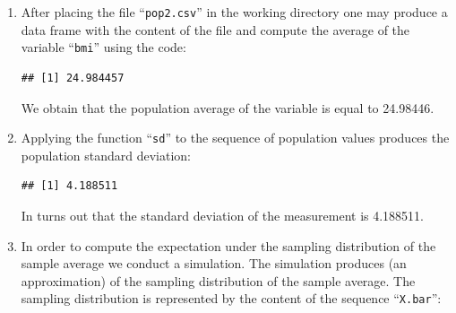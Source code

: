 \documentclass[]{krantz}
\makeatletter
\newenvironment{Shaded}{\begin{snugshade}}{\end{snugshade}}
\newcommand{\ControlFlowTok}[1]{\textcolor[rgb]{0.13,0.29,0.53}{\textbf{#1}}}
\newcommand{\DataTypeTok}[1]{\textcolor[rgb]{0.13,0.29,0.53}{#1}}
\newcommand{\DecValTok}[1]{\textcolor[rgb]{0.00,0.00,0.81}{#1}}
\newcommand{\FloatTok}[1]{\textcolor[rgb]{0.00,0.00,0.81}{#1}}
\newcommand{\KeywordTok}[1]{\textcolor[rgb]{0.13,0.29,0.53}{\textbf{#1}}}
\newcommand{\NormalTok}[1]{#1}
\newcommand{\OperatorTok}[1]{\textcolor[rgb]{0.81,0.36,0.00}{\textbf{#1}}}
\newcommand{\StringTok}[1]{\textcolor[rgb]{0.31,0.60,0.02}{#1}}
\newenvironment{kframe}{%
\medskip{}
\setlength{\fboxsep}{.8em}
 \def\at@end@of@kframe{}%
 \ifinner\ifhmode%
  \def\at@end@of@kframe{\end{minipage}}%
  \begin{minipage}{\columnwidth}%
 \fi\fi%
 \def\FrameCommand##1{\hskip\@totalleftmargin \hskip-\fboxsep
 \colorbox{shadecolor}{##1}\hskip-\fboxsep
     \hskip-\linewidth \hskip-\@totalleftmargin \hskip\columnwidth}%
 \MakeFramed {\advance\hsize-\width
   \@totalleftmargin\z@ \linewidth\hsize
   \@setminipage}}%
 {\par\unskip\endMakeFramed%
 \at@end@of@kframe}
\renewenvironment{Shaded}{\begin{kframe}}{\end{kframe}}
\theoremstyle{definition}
\theoremstyle{definition}
\theoremstyle{definition}
\theoremstyle{remark}
\makeatother
\begin{document}
\begin{enumerate}
\def\labelenumi{\arabic{enumi}.}
\item
  After placing the file ``\texttt{pop2.csv}'' in the working directory one may produce
  a data frame with the content of the file and compute the average of the
  variable ``\texttt{bmi}'' using the code:

\begin{Shaded}
\end{Shaded}

\begin{verbatim}
## [1] 24.984457
\end{verbatim}

  We obtain that the population average of the variable is equal to 24.98446.
\item
  Applying the function ``\texttt{sd}'' to the
  sequence of population values produces the population standard
  deviation:

\begin{Shaded}
\end{Shaded}

\begin{verbatim}
## [1] 4.188511
\end{verbatim}

  In turns out that the standard deviation of the measurement is 4.188511.
\item
  In order to compute the expectation
  under the sampling distribution of the sample average we conduct a
  simulation. The simulation produces (an approximation) of the sampling
  distribution of the sample average. The sampling distribution is
  represented by the content of the sequence ``\texttt{X.bar}'':

\begin{Shaded}
\end{Shaded}


\end{enumerate}
\end{document}
